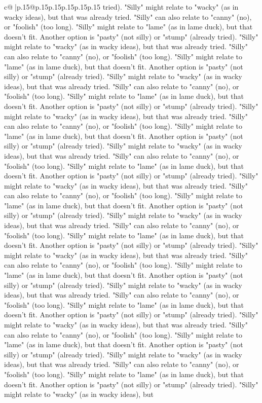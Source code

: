 \documentclass{article}
\begin{document}
{\begin{supertabular}{c@{$\;$}|p{.15\linewidth}@{}p{.15\linewidth}p{.15\linewidth}p{.15\linewidth}p{.15\linewidth}p{.15\linewidth}}
{{{tried). "Silly" might relate to "wacky" (as in wacky ideas), but that was already tried. "Silly" can also relate to "canny" (no), or "foolish" (too long). "Silly" might relate to "lame" (as in lame duck), but that doesn't fit. Another option is "pasty" (not silly) or "stump" (already tried). "Silly" might relate to "wacky" (as in wacky ideas), but that was already tried. "Silly" can also relate to "canny" (no), or "foolish" (too long). "Silly" might relate to "lame" (as in lame duck), but that doesn't fit. Another option is "pasty" (not silly) or "stump" (already tried). "Silly" might relate to "wacky" (as in wacky ideas), but that was already tried. "Silly" can also relate to "canny" (no), or "foolish" (too long). "Silly" might relate to "lame" (as in lame duck), but that doesn't fit. Another option is "pasty" (not silly) or "stump" (already tried). "Silly" might relate to "wacky" (as in wacky ideas), but that was already tried. "Silly" can also relate to "canny" (no), or "foolish" (too long). "Silly" might relate to "lame" (as in lame duck), but that doesn't fit. Another option is "pasty" (not silly) or "stump" (already tried). "Silly" might relate to "wacky" (as in wacky ideas), but that was already tried. "Silly" can also relate to "canny" (no), or "foolish" (too long). "Silly" might relate to "lame" (as in lame duck), but that doesn't fit. Another option is "pasty" (not silly) or "stump" (already tried). "Silly" might relate to "wacky" (as in wacky ideas), but that was already tried. "Silly" can also relate to "canny" (no), or "foolish" (too long). "Silly" might relate to "lame" (as in lame duck), but that doesn't fit. Another option is "pasty" (not silly) or "stump" (already tried). "Silly" might relate to "wacky" (as in wacky ideas), but that was already tried. "Silly" can also relate to "canny" (no), or "foolish" (too long). "Silly" might relate to "lame" (as in lame duck), but that doesn't fit. Another option is "pasty" (not silly) or "stump" (already tried). "Silly" might relate to "wacky" (as in wacky ideas), but that was already tried. "Silly" can also relate to "canny" (no), or "foolish" (too long). "Silly" might relate to "lame" (as in lame duck), but that doesn't fit. Another option is "pasty" (not silly) or "stump" (already tried). "Silly" might relate to "wacky" (as in wacky ideas), but that was already tried. "Silly" can also relate to "canny" (no), or "foolish" (too long). "Silly" might relate to "lame" (as in lame duck), but that doesn't fit. Another option is "pasty" (not silly) or "stump" (already tried). "Silly" might relate to "wacky" (as in wacky ideas), but that was already tried. "Silly" can also relate to "canny" (no), or "foolish" (too long). "Silly" might relate to "lame" (as in lame duck), but that doesn't fit. Another option is "pasty" (not silly) or "stump" (already tried). "Silly" might relate to "wacky" (as in wacky ideas), but that was already tried. "Silly" can also relate to "canny" (no), or "foolish" (too long). "Silly" might relate to "lame" (as in lame duck), but that doesn't fit. Another option is "pasty" (not silly) or "stump" (already tried). "Silly" might relate to "wacky" (as in wacky ideas), but }}}
\end{supertabular}}
\end{document}
